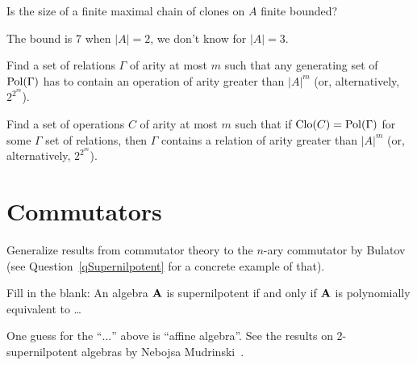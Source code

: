 \begin{question}
  Is the size of a finite maximal chain of clones on $A$ finite bounded?
\end{question}
\begin{context}
  The bound is 7 when $|A|=2$, we don't know for $|A|=3$.
\end{context}

\begin{question}
  Find a set of relations $\Gamma$ of arity at most $m$ such that any generating set
  of $\operatorname{Pol}(\Gamma)$ has to contain an operation of arity greater than $|A|^m$ (or,
  alternatively, $2^{2^m}$).
\end{question}

\begin{question}
  Find a set of operations $C$ of arity at most $m$ such that if
  $\operatorname{Clo}(C)=\operatorname{Pol}(\Gamma)$ for some $\Gamma$ set of relations, then $\Gamma$
  contains a relation of arity greater than $|A|^m$ (or, alternatively,
  $2^{2^m}$).
\end{question}


\section{Commutators}
\begin{question}
Generalize results from commutator theory to the $n$-ary commutator by
Bulatov~\cite{bulatov-on-the-number-of-maltsevs} (see Question~\ref{qSupernilpotent} for a concrete example of
that).
\end{question}

\begin{question}\label{qSupernilpotent}
  Fill in the blank: An algebra ${\mathbf{A}}$ is supernilpotent if and only if
  ${\mathbf{A}}$ is polynomially equivalent to \dots
\end{question}
\begin{context}
  One guess for the ``$\dots$'' above is ``affine algebra''. See the results on
  2-supernilpotent algebras by Nebojsa Mudrinski~\cite{nebojsa}.
\end{context}


